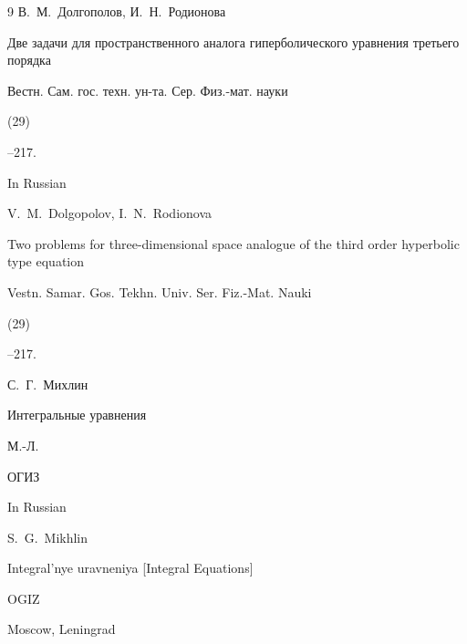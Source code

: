 \begin{thebibliography}{9}
\by В.~М.~Долгополов, И.~Н.~Родионова

\paper Две задачи для пространственного аналога гиперболического уравнения третьего порядка

\jour Вестн. Сам. гос. техн. ун-та. Сер. Физ.-мат. науки


(29)

--217.



\misctransl

\lang In Russian

\by V.~M.~Dolgopolov, I.~N.~Rodionova

\paper Two problems for three-dimensional space analogue of the third order hyperbolic type equation

\jour Vestn. Samar. Gos. Tekhn. Univ. Ser. Fiz.-Mat. Nauki


(29)

--217.














\by С.~Г.~Михлин

\book Интегральные уравнения

\publaddr М.-Л.

\publ ОГИЗ


\misctransl

\lang In Russian

\by S.~G.~Mikhlin

\book Integral'nye uravneniya \rm [Integral Equations]

\publ OGIZ

\publaddr Moscow, Leningrad






\end{thebibliography}










\makeentitle





\newpage



%

